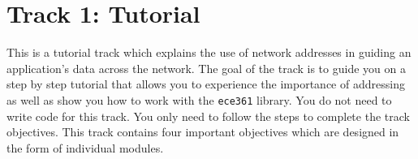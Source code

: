 \documentclass[11pt]{article}
\begin{document}
\section{Track 1: Tutorial}
\label{sec:track1}
This is a tutorial track which explains the use of network addresses in guiding an application's data across the network.
The goal of the track is to guide you on a step by step tutorial that allows you to experience the importance of addressing as well as show you how to work with the \texttt{ece361} library.
You do not need to write code for this track. You only need to follow the steps to complete the track objectives.
This track contains four important objectives which are designed in the form of individual modules.


\end{document}
